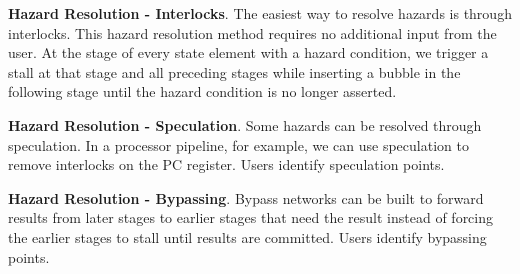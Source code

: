 {\bf Hazard Resolution - Interlocks}. The easiest way to resolve
hazards is through interlocks. This hazard resolution method requires
no additional input from the user. At the stage of every state element
with a hazard condition, we trigger a stall at that stage and all
preceding stages while inserting a bubble in the following stage until
the hazard condition is no longer asserted.

{\bf Hazard Resolution - Speculation}. Some hazards can be resolved
through speculation. In a processor pipeline, for example, we can use
speculation to remove interlocks on the PC register. Users identify
speculation points.

{\bf Hazard Resolution - Bypassing}. Bypass networks can be built to
forward results from later stages to earlier stages that need the
result instead of forcing the earlier stages to stall until results
are committed. Users identify bypassing points.
